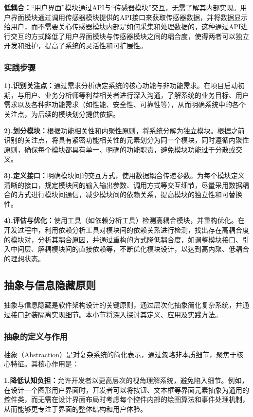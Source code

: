 \textbf{低耦合：}``用户界面''模块通过API与``传感器模块''交互，无需了解其内部实现。用户界面模块通过调用传感器模块提供的API接口来获取传感器数据，并将数据显示给用户，而不需要关心传感器模块内部是如何采集和处理数据的，这种通过API进行交互的方式降低了用户界面模块与传感器模块之间的耦合度，使得两者可以独立开发和维护，提高了系统的灵活性和可扩展性。

\subsubsection{实践步骤}

\textbf{1).识别关注点：}通过需求分析确定系统的核心功能与非功能需求。在项目启动初期，与用户、业务分析师等利益相关者进行深入沟通，了解系统的业务目标、用户需求以及各种非功能需求（如性能、安全性、可靠性等），从而明确系统中的各个关注点，为后续的模块划分提供依据。

\textbf{2).划分模块：}根据功能相关性和内聚性原则，将系统分解为独立模块。根据之前识别的关注点，将具有紧密功能相关性的元素划分为同一个模块，同时遵循内聚性原则，确保每个模块都具有单一、明确的功能职责，避免模块功能过于分散或交叉。

\textbf{3).定义接口：}明确模块间的交互方式，使用数据耦合传递参数。为每个模块定义清晰的接口，规定模块间的输入输出参数、调用方式等交互细节，尽量采用数据耦合的方式进行模块间通信，减少模块间的依赖关系，提高模块的独立性和可替换性。

\textbf{4).评估与优化：}使用工具（如依赖分析工具）检测高耦合模块，并重构优化。在开发过程中，利用依赖分析工具对模块间的依赖关系进行检测，找出存在高耦合度的模块对，分析其耦合原因，并通过重构的方式降低耦合度，如调整模块接口、引入中间层、解耦模块间的直接依赖等，不断优化模块设计，以达到高内聚、低耦合的理想状态。

\subsection{抽象与信息隐藏原则}

抽象与信息隐藏是软件架构设计的关键原则，通过层次化抽象简化复杂系统，并通过接口封装隔离实现细节。本小节将深入探讨其定义、应用及实践方法。

\subsubsection{抽象的定义与作用}

抽象（Abstraction）是对复杂系统的简化表示，通过忽略非本质细节，聚焦于核心特征。其核心作用是：

\textbf{1.降低认知负担：}允许开发者以更高层次的视角理解系统，避免陷入细节。例如，在设计一个图形用户界面时，开发者可以将按钮、文本框等界面元素抽象为通用的控件类，而无需在设计界面布局时考虑每个控件内部的绘图算法和事件处理机制，从而能够更专注于界面的整体结构和用户体验。


